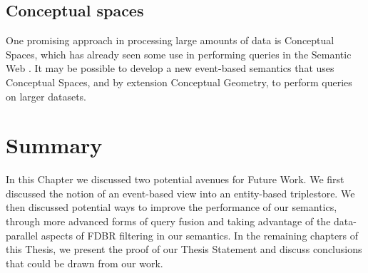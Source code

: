 \documentclass[../main.tex]{subfiles}
\begin{document}
\subsection{Conceptual spaces}

One promising approach in processing large amounts of data is Conceptual Spaces\cite{gardenfors2004conceptual}, which has already seen some use in performing queries in the Semantic Web\cite{wu2006exploring}\cite{adams2009conceptual}\cite{gardenfors2014geometry} .  It may be possible to develop a new event-based semantics that uses Conceptual Spaces, and by extension Conceptual Geometry, to perform queries on larger datasets.

\section{Summary}

In this Chapter we discussed two potential avenues for Future Work.  We first discussed the notion of an event-based view into an entity-based triplestore.
We then discussed potential ways to improve the performance of our semantics, through more advanced forms of query fusion and taking advantage of the data-parallel
aspects of FDBR filtering in our semantics.  In the remaining chapters of this Thesis, we present the proof of our Thesis Statement and discuss conclusions that could be drawn from our work.
\end{document}
